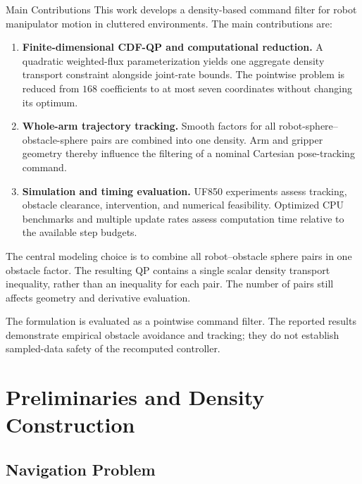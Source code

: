 \documentclass[conference]{IEEEtran}
\begin{document}
\begin{methodbox}{Main Contributions}
This work develops a density-based command filter for
robot manipulator motion in cluttered environments.
The main contributions are:
\begin{enumerate}
    \item \textbf{Finite-dimensional CDF-QP and computational
    reduction.}
    A quadratic weighted-flux parameterization yields
    one aggregate density transport constraint alongside
    joint-rate bounds. The pointwise problem is reduced
    from $168$ coefficients to at most seven coordinates
    without changing its optimum.

    \item \textbf{Whole-arm trajectory tracking.}
    Smooth factors for all robot-sphere--obstacle-sphere
    pairs are combined into one density. Arm and gripper
    geometry thereby influence the filtering of a nominal
    Cartesian pose-tracking command.

    \item \textbf{Simulation and timing evaluation.}
    UF850 experiments assess tracking, obstacle clearance,
    intervention, and numerical feasibility. Optimized CPU
    benchmarks and multiple update rates assess computation
    time relative to the available step budgets.
\end{enumerate}
\end{methodbox}

The central modeling choice is to combine all
robot--obstacle sphere pairs in one obstacle factor.
The resulting QP contains a single scalar density
transport inequality, rather than an inequality for
each pair. The number of pairs still affects geometry
and derivative evaluation.

The formulation is evaluated as a pointwise command
filter. The reported results demonstrate empirical
obstacle avoidance and tracking; they do not establish
sampled-data safety of the recomputed controller.

\section{Preliminaries and Density Construction}
\label{sec:preliminaries}

\subsection{Navigation Problem}
\end{document}
